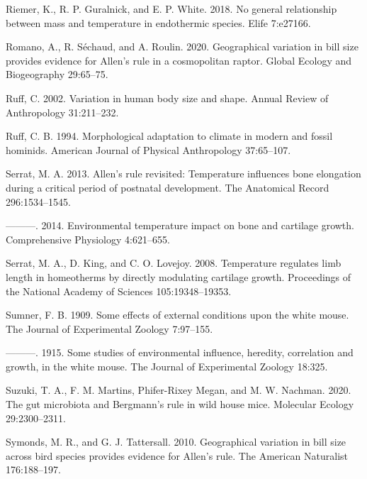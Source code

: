 \documentclass[]{article}
\begin{document}
\leavevmode\hypertarget{ref-Riemer2018}{}%
Riemer, K., R. P. Guralnick, and E. P. White. 2018. No general
relationship between mass and temperature in endothermic species. Elife
7:e27166.

\leavevmode\hypertarget{ref-Romano2020}{}%
Romano, A., R. Séchaud, and A. Roulin. 2020. Geographical variation in
bill size provides evidence for Allen's rule in a cosmopolitan raptor.
Global Ecology and Biogeography 29:65--75.

\leavevmode\hypertarget{ref-Ruff2002}{}%
Ruff, C. 2002. Variation in human body size and shape. Annual Review of
Anthropology 31:211--232.

\leavevmode\hypertarget{ref-Ruff1994}{}%
Ruff, C. B. 1994. Morphological adaptation to climate in modern and
fossil hominids. American Journal of Physical Anthropology 37:65--107.

\leavevmode\hypertarget{ref-Serrat2013}{}%
Serrat, M. A. 2013. Allen's rule revisited: Temperature influences bone
elongation during a critical period of postnatal development. The
Anatomical Record 296:1534--1545.

\leavevmode\hypertarget{ref-Serrat2014}{}%
---------. 2014. Environmental temperature impact on bone and cartilage
growth. Comprehensive Physiology 4:621--655.

\leavevmode\hypertarget{ref-Serrat2008}{}%
Serrat, M. A., D. King, and C. O. Lovejoy. 2008. Temperature regulates
limb length in homeotherms by directly modulating cartilage growth.
Proceedings of the National Academy of Sciences 105:19348--19353.

\leavevmode\hypertarget{ref-Sumner1909}{}%
Sumner, F. B. 1909. Some effects of external conditions upon the white
mouse. The Journal of Experimental Zoology 7:97--155.

\leavevmode\hypertarget{ref-Sumner1915}{}%
---------. 1915. Some studies of environmental influence, heredity,
correlation and growth, in the white mouse. The Journal of Experimental
Zoology 18:325.

\leavevmode\hypertarget{ref-Suzuki2020}{}%
Suzuki, T. A., F. M. Martins, Phifer-Rixey Megan, and M. W. Nachman.
2020. The gut microbiota and Bergmann's rule in wild house mice.
Molecular Ecology 29:2300--2311.

\leavevmode\hypertarget{ref-Symonds2010}{}%
Symonds, M. R., and G. J. Tattersall. 2010. Geographical variation in
bill size across bird species provides evidence for Allen's rule. The
American Naturalist 176:188--197.
\end{document}
